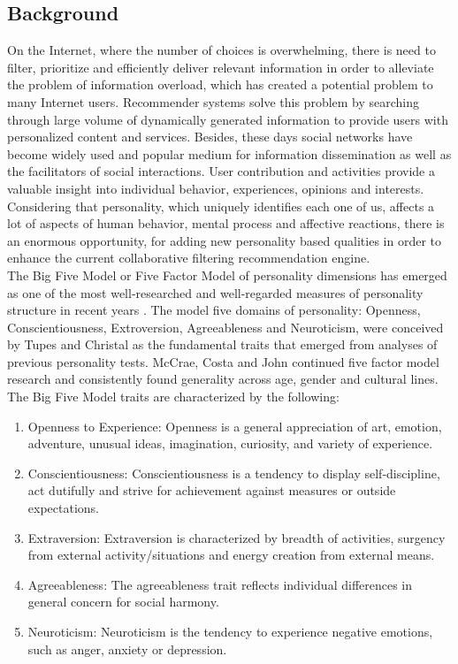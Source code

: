 \documentclass[conference]{IEEEtran}
\begin{document}
\subsection{Background}
On the Internet, where the number of choices is overwhelming, there is need to filter, prioritize and efficiently deliver relevant information in order to alleviate the problem of information overload, which has created a potential problem to many Internet users. Recommender systems solve this problem by searching through large volume of dynamically generated information to provide users with personalized content and services. Besides, these days social networks have become widely used and popular medium for information dissemination as well as the facilitators of social interactions. User contribution and activities provide a valuable insight into individual behavior, experiences, opinions and interests. Considering that personality, which uniquely identifies each one of us, affects a lot of aspects of human behavior, mental process and affective reactions, there is an enormous opportunity, for adding new personality based qualities in order to enhance the current collaborative filtering recommendation engine.\\
The Big Five Model or Five Factor Model of personality dimensions has emerged as one of the most well-researched and well-regarded measures of personality structure in recent years \cite{fivefactormodel}. The model five domains of personality: Openness, Conscientiousness, Extroversion, Agreeableness and Neuroticism, were conceived by Tupes and Christal \cite{tupes} as the fundamental traits that emerged from analyses of previous personality tests. McCrae, Costa and John \cite{mccrae} continued five factor model research and consistently found generality across age, gender and cultural lines.
The Big Five Model traits are characterized by the following:
\begin{enumerate}
\item Openness to Experience: Openness is a general appreciation of art, emotion, adventure, unusual ideas, imagination, curiosity, and variety of experience.
\item Conscientiousness: Conscientiousness is a tendency to display self-discipline, act dutifully and strive for achievement against measures or outside expectations.
\item Extraversion: Extraversion is characterized by breadth of activities, surgency from external activity/situations and energy creation from external means.
\item Agreeableness: The agreeableness trait reflects individual differences in general concern for social harmony.
\item Neuroticism: Neuroticism is the tendency to experience negative emotions, such as anger, anxiety or depression.
\end{enumerate}
\end{document}
